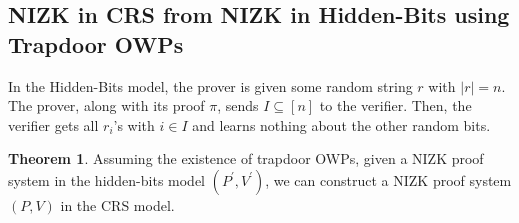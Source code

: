 \documentclass{article}
\theoremstyle{definition}
\newtheorem{theorem}{Theorem}[section]
\begin{document}
\subsection{NIZK in CRS from NIZK in Hidden-Bits using Trapdoor OWPs}

In the Hidden-Bits model, the prover is given some
random string $r$ with $\lvert r \rvert = n$. The prover,
along with its proof $\pi$, sends $I \subseteq [n]$ to the verifier.
Then, the verifier gets all $r_{i}$'s with $i \in I$
and learns nothing about the other random bits.

\begin{theorem}
    Assuming the existence of trapdoor OWPs, given 
    a NIZK proof system in the hidden-bits model
    $(P^{\prime}, V^{\prime})$, we can construct a
    NIZK proof system $(P,V)$ in the CRS model.
\end{theorem}
\end{document}
